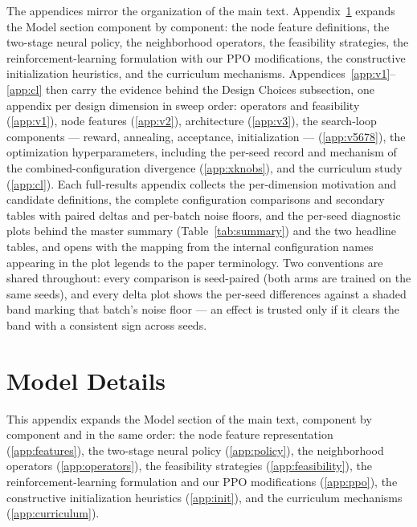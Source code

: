 \documentclass[letterpaper]{article} %
\begin{document}
The appendices mirror the organization of the main text. Appendix~\ref{app:model} expands the Model section component by component: the node feature definitions, the two-stage neural policy, the neighborhood operators, the feasibility strategies, the reinforcement-learning formulation with our PPO modifications, the constructive initialization heuristics, and the curriculum mechanisms. Appendices~\ref{app:v1}--\ref{app:cl} then carry the evidence behind the Design Choices subsection, one appendix per design dimension in sweep order: operators and feasibility (\ref{app:v1}), node features (\ref{app:v2}), architecture (\ref{app:v3}), the search-loop components --- reward, annealing, acceptance, initialization --- (\ref{app:v5678}), the optimization hyperparameters, including the per-seed record and mechanism of the combined-configuration divergence (\ref{app:xknobs}), and the curriculum study (\ref{app:cl}). Each full-results appendix collects the per-dimension motivation and candidate definitions, the complete configuration comparisons and secondary tables with paired deltas and per-batch noise floors, and the per-seed diagnostic plots behind the master summary (Table~\ref{tab:summary}) and the two headline tables, and opens with the mapping from the internal configuration names appearing in the plot legends to the paper terminology. Two conventions are shared throughout: every comparison is seed-paired (both arms are trained on the same seeds), and every delta plot shows the per-seed differences against a shaded band marking that batch's noise floor --- an effect is trusted only if it clears the band with a consistent sign across seeds.

\section{Model Details}
\label{app:model}

This appendix expands the Model section of the main text, component by component and in the same order: the node feature representation (\ref{app:features}), the two-stage neural policy (\ref{app:policy}), the neighborhood operators (\ref{app:operators}), the feasibility strategies (\ref{app:feasibility}), the reinforcement-learning formulation and our PPO modifications (\ref{app:ppo}), the constructive initialization heuristics (\ref{app:init}), and the curriculum mechanisms (\ref{app:curriculum}).
\end{document}

